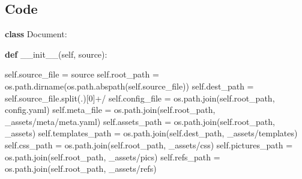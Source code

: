 \documentclass[
]{article}
\newenvironment{Shaded}{}{}
\newcommand{\DecValTok}[1]{\textcolor[rgb]{0.25,0.63,0.44}{#1}}
\newcommand{\FunctionTok}[1]{\textcolor[rgb]{0.02,0.16,0.49}{#1}}
\newcommand{\KeywordTok}[1]{\textcolor[rgb]{0.00,0.44,0.13}{\textbf{#1}}}
\newcommand{\NormalTok}[1]{#1}
\newcommand{\OperatorTok}[1]{\textcolor[rgb]{0.40,0.40,0.40}{#1}}
\newcommand{\StringTok}[1]{\textcolor[rgb]{0.25,0.44,0.63}{#1}}
\newcommand{\VariableTok}[1]{\textcolor[rgb]{0.10,0.09,0.49}{#1}}
\begin{document}
\subsection{Code}\label{code}

\begin{Shaded}
\begin{Highlighting}[numbers=left,,firstnumber=100,]
\KeywordTok{class}\NormalTok{ Document:}

    \KeywordTok{def} \FunctionTok{\_\_init\_\_}\NormalTok{(}\VariableTok{self}\NormalTok{, source):}

        \VariableTok{self}\NormalTok{.source\_file    }\OperatorTok{=}\NormalTok{ source}
        \VariableTok{self}\NormalTok{.root\_path      }\OperatorTok{=}\NormalTok{ os.path.dirname(os.path.abspath(}\VariableTok{self}\NormalTok{.source\_file))}
        \VariableTok{self}\NormalTok{.dest\_path      }\OperatorTok{=} \VariableTok{self}\NormalTok{.source\_file.split(}\StringTok{\textquotesingle{}.\textquotesingle{}}\NormalTok{)[}\DecValTok{0}\NormalTok{]}\OperatorTok{+}\StringTok{\textquotesingle{}/\textquotesingle{}}
        \VariableTok{self}\NormalTok{.config\_file    }\OperatorTok{=}\NormalTok{ os.path.join(}\VariableTok{self}\NormalTok{.root\_path, }\StringTok{\textquotesingle{}config.yaml\textquotesingle{}}\NormalTok{)}
        \VariableTok{self}\NormalTok{.meta\_file      }\OperatorTok{=}\NormalTok{ os.path.join(}\VariableTok{self}\NormalTok{.root\_path, }\StringTok{\textquotesingle{}\_assets/meta/meta.yaml\textquotesingle{}}\NormalTok{)}
        \VariableTok{self}\NormalTok{.assets\_path    }\OperatorTok{=}\NormalTok{ os.path.join(}\VariableTok{self}\NormalTok{.root\_path, }\StringTok{\textquotesingle{}\_assets\textquotesingle{}}\NormalTok{)}
        \VariableTok{self}\NormalTok{.templates\_path }\OperatorTok{=}\NormalTok{ os.path.join(}\VariableTok{self}\NormalTok{.dest\_path, }\StringTok{\textquotesingle{}\_assets/templates\textquotesingle{}}\NormalTok{)}
        \VariableTok{self}\NormalTok{.css\_path       }\OperatorTok{=}\NormalTok{ os.path.join(}\VariableTok{self}\NormalTok{.root\_path, }\StringTok{\textquotesingle{}\_assets/css\textquotesingle{}}\NormalTok{)}
        \VariableTok{self}\NormalTok{.pictures\_path  }\OperatorTok{=}\NormalTok{ os.path.join(}\VariableTok{self}\NormalTok{.root\_path, }\StringTok{\textquotesingle{}\_assets/pics\textquotesingle{}}\NormalTok{)}
        \VariableTok{self}\NormalTok{.refs\_path      }\OperatorTok{=}\NormalTok{ os.path.join(}\VariableTok{self}\NormalTok{.root\_path, }\StringTok{\textquotesingle{}\_assets/refs\textquotesingle{}}\NormalTok{)}


\end{Highlighting}
\end{Shaded}
\end{document}
